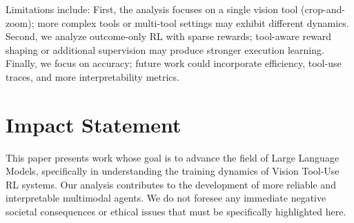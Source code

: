 Limitations include:
%
First, the analysis focuses on a single vision tool (crop-and-zoom); more complex tools or multi-tool settings may exhibit different dynamics.
%
Second, we analyze outcome-only RL with sparse rewards; tool-aware reward shaping or additional supervision may produce stronger execution learning.
%
Finally, we focus on accuracy; future work could incorporate efficiency, tool-use traces, and more interpretability metrics.

%
\clearpage

\newpage
\section*{Impact Statement}
This paper presents work whose goal is to advance the field of Large Language Models, specifically in understanding the training dynamics of Vision Tool-Use RL systems. Our analysis contributes to the development of more reliable and interpretable multimodal agents. We do not foresee any immediate negative societal consequences or ethical issues that must be specifically highlighted here.




